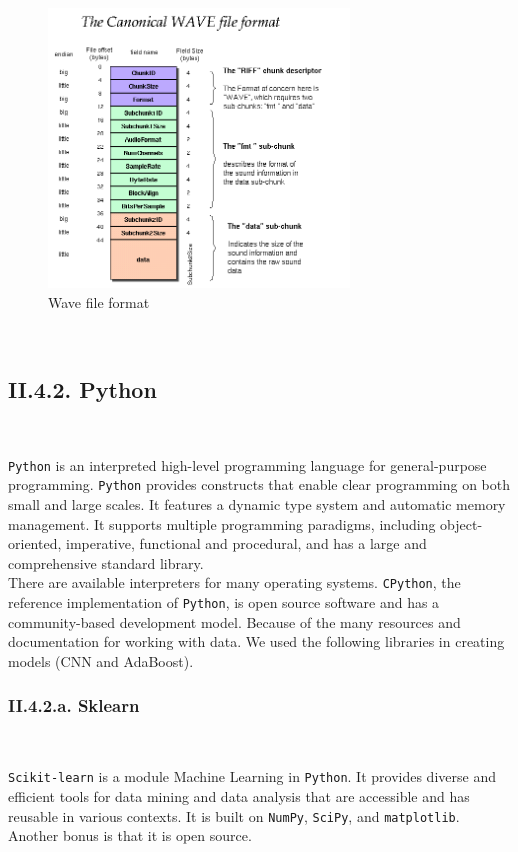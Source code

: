 \documentclass[11pt, a4papper]{report}
\theoremstyle{plain}
\theoremstyle{definition}
\theoremstyle{definition}
\theoremstyle{proposition}
\begin{document}
\begin{figure}[H]
\includegraphics[width=8cm]{wav-sound-format.png}
\centering
\caption{Wave file format}
\end{figure}
\

\subsection*{II.4.2. Python}

\

\verb|Python| is an interpreted high-level programming language for general-purpose programming. \verb|Python| provides constructs that enable clear programming on both small and large scales. It features a dynamic type system and automatic memory management. It supports multiple programming paradigms, including object-oriented, imperative, functional and procedural, and has a large and comprehensive standard library.
\\

There are available interpreters for many operating systems. \verb|CPython|, the reference implementation of \verb|Python|, is open source software and has a community-based development model. Because of the many resources and documentation for working with data. We used the following libraries in creating models (CNN and AdaBoost).
\\

\subsubsection*{II.4.2.a. Sklearn}

\

\verb|Scikit-learn| is a module Machine Learning in \verb|Python|. It provides diverse and efficient tools for data mining and data analysis that are accessible and has reusable in various contexts. It is built on \verb|NumPy|, \verb|SciPy|, and \verb|matplotlib|. Another bonus is that it is open source.
\\
\end{document}
